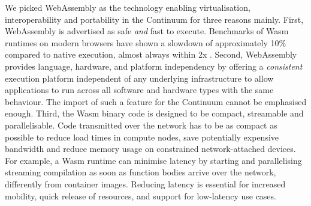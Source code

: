 

We picked WebAssembly as the technology enabling virtualisation, interoperability and portability in the Continuum for three reasons mainly. First, WebAssembly is advertised as safe \textit{and} fast to execute. Benchmarks of Wasm runtimes on modern browsers have shown a slowdown of approximately 10\% compared to native execution, almost always within 2x \cite{haas2017bringing}. Second, WebAssembly provides language, hardware, and platform independency by offering a \textit{consistent} execution platform independent of any underlying infrastructure to allow applications to run across all software and hardware types with the same behaviour. The import of such a feature for the Continuum cannot be emphasised enough. Third, the Wasm binary code is designed to be compact, streamable and parallelisable. Code transmitted over the network has to be as compact as possible to reduce load times in compute nodes, save potentially expensive bandwidth and reduce memory usage on constrained network-attached devices. For example, a Wasm runtime can minimise latency by starting and parallelising streaming compilation as soon as function bodies arrive over the network, differently from container images. Reducing latency is essential for increased mobility, quick release of resources, and support for low-latency use cases.


